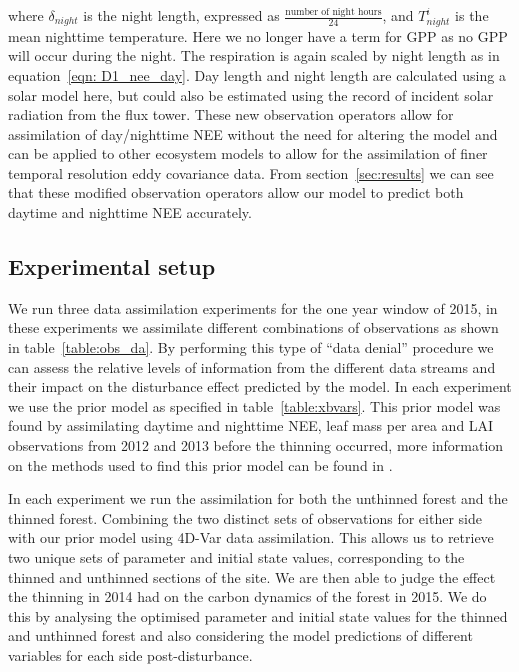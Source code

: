 \documentclass[draft,linenumbers]{agujournal}
\begin{document}
where \(\delta_{night}\) is the night length, expressed as \(\frac{\text{number of night hours}}{24}\), and \(T_{night}^{i}\) is the mean nighttime temperature. Here we no longer have a term for GPP as no GPP will occur during the night. The respiration is again scaled by night length as in equation~\eqref{eqn: D1_nee_day}. Day length and night length are calculated using a solar model here, but could also be estimated using the record of incident solar radiation from the flux tower. These new observation operators allow for assimilation of day/nighttime NEE without the need for altering the model and can be applied to other ecosystem models to allow for the assimilation of finer temporal resolution eddy covariance data. From section~\ref{sec:results} we can see that these modified observation operators allow our model to predict both daytime and nighttime NEE accurately.


\subsection{Experimental setup}


We run three data assimilation experiments for the one year window of 2015, in these experiments we assimilate different combinations of observations as shown in table~\ref{table:obs_da}. By performing this type of ``data denial'' procedure we can assess the relative levels of information from the different data streams and their impact on the disturbance effect predicted by the model. In each experiment we use the prior model as specified in table~\ref{table:xbvars}. This prior model was found by assimilating daytime and nighttime NEE, leaf mass per area and LAI observations from 2012 and 2013 before the thinning occurred, more information on the methods used to find this prior model can be found in \citet{Pinnington2016299}.   

In each experiment we run the assimilation for both the unthinned forest and the thinned forest. Combining the two distinct sets of observations for either side with our prior model using 4D-Var data assimilation. This allows us to retrieve two unique sets of parameter and initial state values, corresponding to the thinned and unthinned sections of the site. We are then able to judge the effect the thinning in 2014 had on the carbon dynamics of the forest in 2015. We do this by analysing the optimised parameter and initial state values for the thinned and unthinned forest and also considering the model predictions of different variables for each side post-disturbance. 
\end{document}
